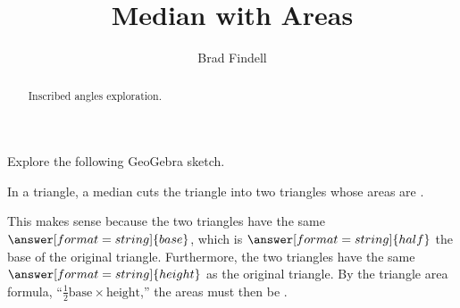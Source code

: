 \documentclass[handout,nooutcomes]{ximera}
\title{Median with Areas}
\author{Brad Findell}
\begin{document}
\begin{abstract}
Inscribed angles exploration. 
\end{abstract}
\maketitle




\begin{problem}
Explore the following GeoGebra sketch.  
\begin{center}  
\end{center}
In a triangle, a median cuts the triangle into two triangles whose areas are .  

This makes sense because the two triangles have the same $\answer[format=string]{base}$, which is 
$\answer[format=string]{half}$ the base of the original triangle.  Furthermore, the two triangles have the same $\answer[format=string]{height}$ as the original triangle.  By the triangle area formula, ``$\frac{1}{2} \textrm{base} \times \textrm{height}$,'' the areas must then be .

\end{problem}
\end{document}
